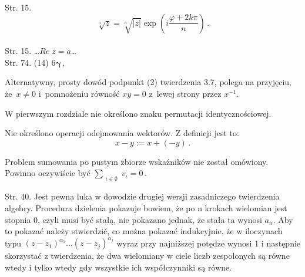 \documentclass[a4paper,11pt]{article}
\begin{document}
Str. 15.
$$\sqrt[ n ]{ z } = \sqrt[ n ]{ | z | } \exp( i \frac{ \varphi + 2 k
  \pi }{ n } ) \, .$$ \\
Str. 15. \ldots $Re \; z = a$\ldots \\
Str. 74. (14) $6 \boldsymbol{ \gamma } \, ,$ \\


\vspace{\spaceTwo}















\start {}

\vspace{\spaceFour}



\start {} Alternatywny, prosty dowód podpunkt (2) twierdzenia
3.7, polega na przyjęciu, że~$x \neq 0$ i~pomnożeniu równość $xy = 0$
z~lewej strony przez $x^{ -1 }$.

\vspace{\spaceFour}



W pierwszym rozdziale nie określono znaku permutacji
identycznościowej.

\vspace{\spaceFour}



Nie określono operacji odejmowania wektorów. Z definicji jest
to:$$x - y := x + ( -y ) \, .$$

\vspace{\spaceFour}



Problem sumowania po pustym zbiorze wskaźników nie został omówiony.
Powinno oczywiście być $\sum_{ \substack{ \iota \in \emptyset } } v_{ \iota } = 0 \, .$

\vspace{\spaceFour}



Str. 40. Jest pewna luka w dowodzie drugiej wersji zasadniczego
twierdzenia algebry. Procedura dzielenia pokazuje bowiem, że po n
krokach wielomian jest stopnia 0, czyli musi być stałą, nie pokazano
jednak, że stała ta wynosi $a_{ n }$. Aby to pokazać należy
stwierdzić, co można pokazać indukcyjnie, że w iloczynach typu
$( z - z_{ 1 } )^{ \alpha_{ 1 } } \ldots( z - z_{ j } )^{ \alpha_{ j } }$
wyraz przy najniższej potędze wynosi 1 i następnie skorzystać z
twierdzenia, że dwa wielomiany w ciele liczb zespolonych są równe
wtedy i tylko wtedy gdy wszystkie ich współczynniki są równe.
\end{document}
